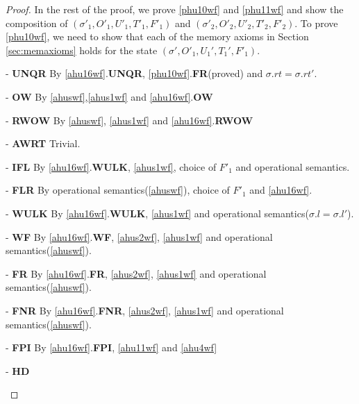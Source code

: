 \begin{proof}
In the rest of the proof, we prove \ref{phu10wf} and \ref{phu11wf} and show the composition of $(\sigma'_1, O'_1, U'_1,T'_1,F'_1)$ and  $(\sigma'_2, O'_2, U'_2,T'_2,F'_2)$. To prove \ref{phu10wf}, we need to show that each of the memory axioms in Section \ref{sec:memaxioms} holds for the state $(\sigma',O'_1,U_1',T_1',F'_1)$.
\begin{case} - \textbf{UNQR} By \ref{ahu16wf}.\textbf{UNQR}, \ref{phu10wf}.\textbf{FR}(proved) and $\sigma.rt = \sigma.rt'$.
\end{case}
\begin{case} - \textbf{OW} By \ref{ahuswf},\ref{ahus1wf} and \ref{ahu16wf}.\textbf{OW}
\end{case}
\begin{case} - \textbf{RWOW} By \ref{ahuswf}, \ref{ahus1wf} and \ref{ahu16wf}.\textbf{RWOW}
\end{case}
\begin{case} - \textbf{AWRT} Trivial. 
\end{case}
\begin{case} - \textbf{IFL}  By \ref{ahu16wf}.\textbf{WULK}, \ref{ahus1wf}, choice of $F'_1$ and operational semantics.
\end{case}
\begin{case} - \textbf{FLR}  By operational semantics(\ref{ahuswf}), choice of $F'_1$ and \ref{ahu16wf}. 
\end{case}
\begin{case} - \textbf{WULK}  By \ref{ahu16wf}.\textbf{WULK}, \ref{ahus1wf} and operational semantics($\sigma.l = \sigma.l'$).
\end{case}
\begin{case} - \textbf{WF} By \ref{ahu16wf}.\textbf{WF}, \ref{ahus2wf}, \ref{ahus1wf} and operational semantics(\ref{ahuswf}).
\end{case}
\begin{case} - \textbf{FR} By \ref{ahu16wf}.\textbf{FR}, \ref{ahus2wf}, \ref{ahus1wf} and operational semantics(\ref{ahuswf}).
\end{case}
\begin{case} - \textbf{FNR} By \ref{ahu16wf}.\textbf{FNR}, \ref{ahus2wf}, \ref{ahus1wf} and operational semantics(\ref{ahuswf}).
\end{case}
\begin{case} - \textbf{FPI} By \ref{ahu16wf}.\textbf{FPI}, \ref{ahu11wf} and \ref{ahu4wf}
\end{case} 
\begin{case} - \textbf{HD} 
\end{case}

\end{proof}
